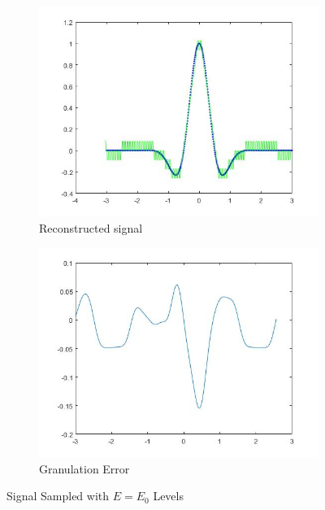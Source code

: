 \documentclass{article}
\begin{document}
\begin{figure}[H]
  \begin{center}
    \begin{subfigure}[b]{0.4\linewidth}
      \includegraphics[width = \linewidth]{Del_1.jpg}
      \caption{Reconstructed signal}
    \end{subfigure}
    \begin{subfigure}[b]{0.4\linewidth}
      \includegraphics[width = \linewidth]{Del_Error_1.jpg}
      \caption{Granulation Error}
    \end{subfigure}
    \caption{Signal Sampled with $E = E_0$ Levels}
    \label{fig:figure4}
  \end{center}
\end{figure}
\end{document}
